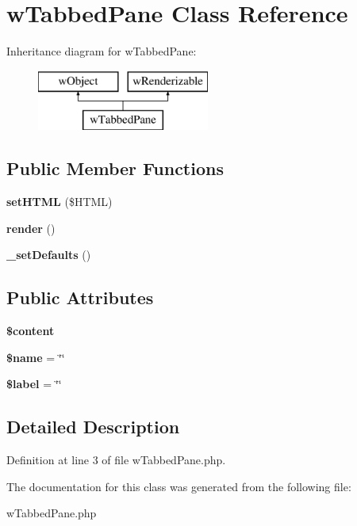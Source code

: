 \hypertarget{classwTabbedPane}{
\section{wTabbedPane Class Reference}
\label{classwTabbedPane}
}
Inheritance diagram for wTabbedPane:\begin{figure}[H]
\begin{center}
\leavevmode
\includegraphics[height=2.000000cm]{classwTabbedPane}
\end{center}
\end{figure}
\subsection*{Public Member Functions}
\begin{DoxyCompactItemize}
\item 
\hypertarget{classwTabbedPane_ae805392b9455756b4e31802e1748c52a}{
{\bfseries setHTML} (\$HTML)}
\label{classwTabbedPane_ae805392b9455756b4e31802e1748c52a}

\item 
\hypertarget{classwTabbedPane_a57255405a9c4e444ac2934d0fb22af41}{
{\bfseries render} ()}
\label{classwTabbedPane_a57255405a9c4e444ac2934d0fb22af41}

\item 
\hypertarget{classwTabbedPane_a7ef6330ae936bce535ffb1960086c099}{
{\bfseries \_\-setDefaults} ()}
\label{classwTabbedPane_a7ef6330ae936bce535ffb1960086c099}

\end{DoxyCompactItemize}
\subsection*{Public Attributes}
\begin{DoxyCompactItemize}
\item 
\hypertarget{classwTabbedPane_a94c1683b7caee875db7b3f43144efa31}{
{\bfseries \$content}}
\label{classwTabbedPane_a94c1683b7caee875db7b3f43144efa31}

\item 
\hypertarget{classwTabbedPane_af6939118bf38c182ad97afc5371d7bb2}{
{\bfseries \$name} = \char`\"{}\char`\"{}}
\label{classwTabbedPane_af6939118bf38c182ad97afc5371d7bb2}

\item 
\hypertarget{classwTabbedPane_a30950db583a10ecda9cfccb92fb2d4fc}{
{\bfseries \$label} = \char`\"{}\char`\"{}}
\label{classwTabbedPane_a30950db583a10ecda9cfccb92fb2d4fc}

\end{DoxyCompactItemize}


\subsection{Detailed Description}


Definition at line 3 of file wTabbedPane.php.



The documentation for this class was generated from the following file:\begin{DoxyCompactItemize}
\item 
wTabbedPane.php\end{DoxyCompactItemize}
